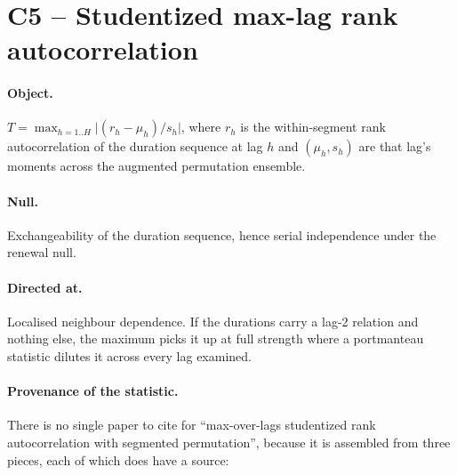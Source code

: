 \documentclass[11pt,a4paper]{article}
\begin{document}
\section{C5 -- Studentized max-lag rank autocorrelation}

\paragraph{Object.}
$T = \max_{h=1..H}\bigl| (r_h - \mu_h)/s_h \bigr|$, where $r_h$ is the within-segment
rank autocorrelation of the duration sequence at lag $h$ and $(\mu_h, s_h)$ are that
lag's moments across the augmented permutation ensemble.

\paragraph{Null.} Exchangeability of the duration sequence, hence serial independence
under the renewal null.

\paragraph{Directed at.} Localised neighbour dependence. If the durations carry a lag-2
relation and nothing else, the maximum picks it up at full strength where a portmanteau
statistic dilutes it across every lag examined.

\paragraph{Provenance of the statistic.} There is no single paper to cite for
\enquote{max-over-lags studentized rank autocorrelation with segmented permutation},
because it is assembled from three pieces, each of which does have a source:
\end{document}
